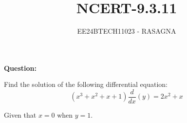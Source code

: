 \documentclass[journal]{IEEEtran}
\begin{document}

\vspace{3cm}

\title{NCERT-9.3.11}
\author{EE24BTECH11023 - RASAGNA}

{\let\newpage\relax\maketitle}

\renewcommand{\thefigure}{\theenumi}
\renewcommand{\thetable}{\theenumi}
\setlength{\intextsep}{10pt} %


\renewcommand{\thetable}{\theenumi}


\textbf{Question:}

Find the solution of the following differential equation:
$$
(x^3 + x^2 + x + 1) \frac{d}{dx}(y) = 2x^2 + x
$$
\begin{center}
    Given that $x = 0$ when $y = 1$.
\end{center}
\end{document}
